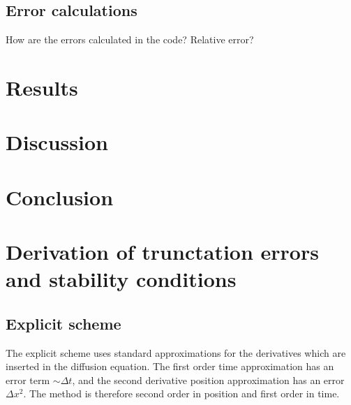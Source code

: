 \documentclass[aps,reprint]{revtex4-1}
\newcommand\blankpage{%
  \null
  \thispagestyle{empty}%
  \addtocounter{page}{-1}%
  \newpage}
\begin{document}
\subsection{Error calculations}
How are the errors calculated in the code? Relative error?
\section{Results} \label{sec:results}
\section{Discussion} \label{sec:discussion}
\section{Conclusion} \label{sec:conclusion}

\blankpage
\appendix
\section{Derivation of trunctation errors and stability conditions} \label{sec:errors}
\subsection{Explicit scheme}
The explicit scheme uses standard approximations for the derivatives which are
inserted in the diffusion equation. The first order time approximation has
an error term $\sim \Delta{t}$, and the second derivative position approximation
has an error $\Delta{x^2}$. The method is therefore second order in position and
first order in time.
\end{document}
